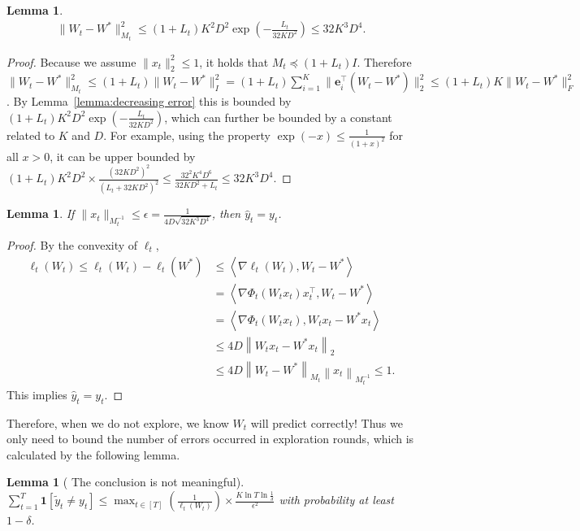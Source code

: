 \documentclass{article}
\newcommand{\one}{\boldsymbol{1}}
\newcommand{\nb}{\nabla}
\newcommand{\e}{\mathbf{e}}
\newcommand{\inner}[1]{ \left\langle {#1} \right\rangle }
\newcommand{\norm}[1]{\left\|{#1}\right\|}
\newtheorem{lemma}[theorem]{Lemma}
\begin{document}
\begin{lemma}
\begin{align*}
\|W_{t}-W^*\|_{M_{t}}^2 \leq (1+L_t)K^2D^2 \exp\left(-\frac{L_t}{32KD^2}\right) \leq 32K^3D^4. 
\end{align*}
\end{lemma}
\begin{proof}
Because we assume $\|x_t\|_2^2\leq 1$, it holds that $ M_t \preceq (1+L_t) I$. Therefore $\|W_t-W^*\|_{M_t}^2 \leq (1+L_t)\|W_t-W^*\|_I^2 =  (1+L_t) \sum_{i=1}^K \| \e_i^\top (W_t-W^*) \|_2^2 \leq (1+L_t) K \|W_t-W^*\|_F^2 $. By Lemma~\ref{lemma:decreasing error} this is bounded by $(1+L_t)K^2D^2\exp\left( -\frac{L_t}{32KD^2} \right)$, which can further be bounded by a constant related to $K$ and $D$. For example, using the property $\exp(-x)\leq \frac{1}{(1+x)^2}$ for all $x>0$, it can be upper bounded by $(1+L_t)K^2D^2 \times \frac{(32KD^2)^2}{(L_t+32KD^2)^2} \leq \frac{32^2K^4D^6}{32KD^2+L_t}\leq 32K^3D^4$.   
\end{proof}

\begin{lemma}
\label{lemma: xbounded}
If $\|x_t\|_{M_t^{-1}}\leq \epsilon = \frac{1}{4D\sqrt{32K^3D^4}}$, then $\hat{y}_t=y_t$. 
\end{lemma}
\begin{proof}
By the convexity of $\ell_t$, 
\begin{align*}
    \ell_t(W_t)\leq \ell_t(W_t)-\ell_t(W^*)&\leq \inner{\nb \ell_t(W_t), W_t-W^*}\\
     & = \inner{\nb\Phi_t(W_tx_t)x_t^\top, W_t - W^*} \\
    & = \inner{\nb\Phi_t(W_tx_t), W_tx_t - W^*x_t} \\
    & \leq 4D\norm{W_tx_t-W^*x_t}_2 \\
    & \leq 4D\norm{W_t-W^*}_{M_t}\norm{x_t}_{M_t^{-1}} \leq 1.
\end{align*}
This implies $\hat{y}_t=y_t$. 
\end{proof}

Therefore, when we do not explore, we know $W_t$ will predict correctly! Thus we only need to bound the number of errors occurred in exploration rounds, which is calculated by the following lemma. 

\begin{lemma}[{\color{blue} The conclusion is not meaningful}]
\label{lemma:N}
$\sum_{t=1}^T \one[\tilde{y}_t\neq y_t] \leq \max_{t\in[T]}\left(\frac{1}{\ell_{t}(W_t)}\right)\times \frac{K\ln T\ln \frac{1}{\delta}}{\epsilon^2}$ with probability at least $1-\delta$. 
\end{lemma}
\end{document}
